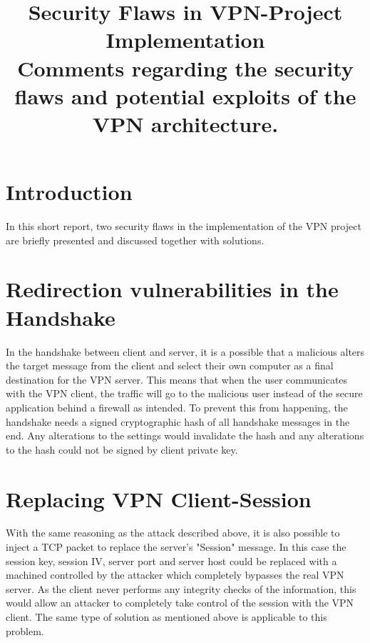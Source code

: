 \documentclass[conference]{IEEEtran}
\begin{document}
\title{Security Flaws in VPN-Project Implementation\\
{\footnotesize Comments regarding the security flaws and potential exploits of the VPN architecture.}
}

\author{
}

\maketitle

\section{Introduction}
In this short report, two security flaws in the implementation of the VPN project are briefly presented and discussed together with solutions.

\section{Redirection vulnerabilities in the Handshake}
In the handshake between client and server, it is a possible that a malicious alters the target message from the client and select their own computer as a final destination for the VPN server. This means that when the user communicates with the VPN client, the traffic will go to the malicious user instead of the secure application behind a firewall as intended. To prevent this from happening, the handshake needs a signed cryptographic hash of all handshake messages in the end. Any alterations to the settings would invalidate the hash and any alterations to the hash could not be signed by client private key.

\section{Replacing VPN Client-Session}
With the same reasoning as the attack described above, it is also possible to inject a TCP packet to replace the server's "Session" message. In this case the session key, session IV, server port and server host could be replaced with a machined controlled by the attacker which completely bypasses the real VPN server. As the client never performs any integrity checks of the information, this would allow an attacker to completely take control of the session with the VPN client. The same type of solution as mentioned above is applicable to this problem. 
\end{document}
